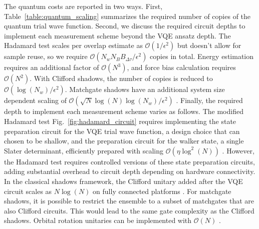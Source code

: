 \documentclass[../main.tex]{subfiles}
\begin{document}
The quantum costs are reported in two ways. First, Table~\ref{table:quantum_scaling} summarizes the required number of copies of the quantum trial wave function. Second, we discuss the required circuit depths to implement each measurement scheme beyond the VQE ansatz depth.
The Hadamard test scales per overlap estimate as $\mathcal{O}(1/\epsilon^2)$ but doesn't allow for sample reuse, so we require $\mathcal{O}(N_w N_B B_{\Delta \tau}/\epsilon^2)$ copies in total. Energy estimation requires an additional factor of $\mathcal{O}(N^3)$, and force bias calculation requires $\mathcal{O}(N^2)$.
With Clifford shadows, the number of copies is reduced to  $\mathcal{O}(\log(N_w)/\epsilon^2)$. Matchgate shadows have an additional system size dependent scaling of $\mathcal{O}(\sqrt{N} \log(N)\log(N_w)/\epsilon^2 )$ \cite{wan2022matchgate}.
Finally, the required depth to implement each measurement scheme varies as follows. The modified Hadamard test Fig.~\ref{fig:hadamard_circuit} requires implementing the state preparation circuit for the VQE trial wave function, a design choice that can chosen to be shallow, and the preparation circuit for the walker state, a single Slater determinant, efficiently prepared with scaling $\mathcal{O}(\eta \log^2(N))$ \cite{wecker2015solving, kivlichan2018quantum, google2020hartree,chee2023shallow}. However, the Hadamard test requires controlled versions of these state preparation circuits, adding substantial overhead to circuit depth depending on hardware connectivity.
In the classical shadows framework, the Clifford unitary added after the VQE circuit scales as $N\log(N)$ on fully connected platforms \cite{berg2021simple}. For matchgate shadows, it is possible to restrict the ensemble to a subset of matchgates that are also Clifford circuits. This would lead to the same gate complexity as the Clifford shadows. Orbital rotation unitaries can be implemented with $\mathcal{O}(N)$ \cite{reck1993experimental}.
\end{document}
